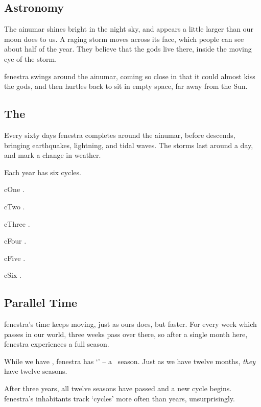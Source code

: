 \begin{multicols}{2}

\subsection{Astronomy}

The \gls{ainumar} shines bright in the night sky, and appears a little larger than our moon does to us.
A raging storm moves across its face, which people can see about half of the year.
They believe that the gods live there, inside the moving eye of the storm.

\Gls{fenestra} swings around the \gls{ainumar}, coming so close in that it could almost kiss the gods, and then hurtles back to sit in empty space, far away from the Sun.

\subsection{The }

Every sixty days \gls{fenestra} completes  around the \gls{ainumar}, before  descends, bringing earthquakes, lightning, and tidal waves.
The \glspl{storm} last around a day, and mark a change in weather.

Each year has six \glspl{cycle}.

\Gls{cOne} .

\Gls{cTwo} .

\Gls{cThree} .

\Gls{cFour} .

\Gls{cFive} .

\Gls{cSix} .

\subsection{Parallel Time}

\Gls{fenestra}'s time keeps moving, just as ours does, but faster.
For every week which passes in our world, three weeks pass over there, so after a single month here, \gls{fenestra} experiences a full season.

While we have \trackMonth, \gls{fenestra} has `\showCycle' -- a \showTemperature\ season.
Just as we have twelve months, \emph{they} have twelve seasons.

After three years, all twelve seasons have passed and a new cycle begins.
\Gls{fenestra}'s inhabitants track `\glspl{cycle}' more often than years, unsurprisingly.

\end{multicols}


